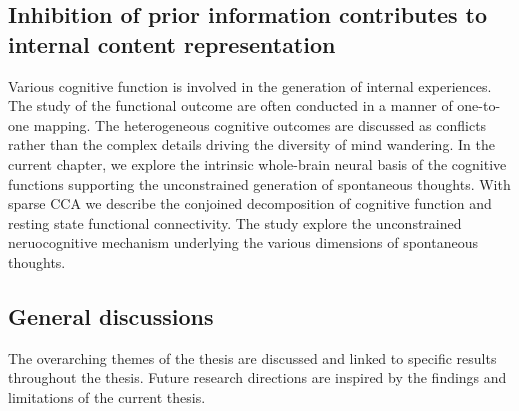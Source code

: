 \subsection*{Inhibition of prior information contributes to internal content representation}
Various cognitive function is involved in the generation of internal experiences. The study of the functional outcome are often conducted in a manner of one-to-one mapping. The heterogeneous cognitive outcomes are discussed as conflicts rather than the complex details driving the diversity of mind wandering. In the current chapter, we explore the intrinsic whole-brain neural basis of the cognitive functions supporting the unconstrained generation of spontaneous thoughts.  With sparse CCA we describe the conjoined decomposition of cognitive function and resting state functional connectivity. The study explore the unconstrained neruocognitive mechanism underlying the various dimensions of spontaneous thoughts.

\subsection*{General discussions}
The overarching themes of the thesis are discussed and linked to specific results throughout the thesis. Future research directions are inspired by the findings and limitations of the current thesis.

